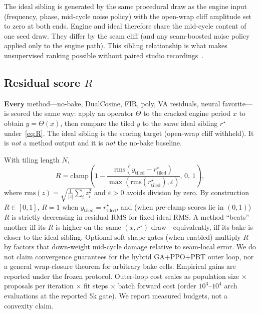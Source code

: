 The ideal sibling is generated by the same procedural draw as the engine input (frequency, phase, mid-cycle noise policy) with the open-wrap cliff amplitude set to zero at both ends.
Engine and ideal therefore share the mid-cycle content of one seed draw.
They differ by the seam cliff (and any seam-boosted noise policy applied only to the engine path).
This sibling relationship is what makes unsupervised ranking possible without paired studio recordings~\cite{lehtinen2018,kashyap2021n2n}.

\subsection{Residual score $R$}
\label{sec:residual-score}

\textbf{Every} method---no-bake, DualCosine, FIR, poly, VA residuals, neural favorite---is scored the same way:
apply an operator $\Theta$ to the cracked engine period $x$ to obtain $y=\Theta(x)$, then compare the tiled $y$ to the \emph{same} ideal sibling $r^{\star}$ under~\eqref{eq:R}.
The ideal sibling is the scoring target (open-wrap cliff withheld).
It is \emph{not} a method output and it is \emph{not} the no-bake baseline.

With tiling length $N$,
\begin{equation}
\label{eq:R}
R=\mathrm{clamp}\!\left(1-\frac{\mathrm{rms}(y_{\mathrm{tiled}}-r^{\star}_{\mathrm{tiled}})}{\max(\mathrm{rms}(r^{\star}_{\mathrm{tiled}}),\varepsilon)},\,0,\,1\right),
\end{equation}
where $\mathrm{rms}(z)=\sqrt{\frac{1}{|z|}\sum_i z_i^2}$ and $\varepsilon>0$ avoids division by zero.
By construction $R\in[0,1]$, $R{=}1$ when $y_{\mathrm{tiled}}=r^{\star}_{\mathrm{tiled}}$, and (when pre-clamp scores lie in $(0,1)$) $R$ is strictly decreasing in residual RMS for fixed ideal RMS.
A method ``beats'' another iff its $R$ is higher on the same $(x,r^{\star})$ draw---equivalently, iff its bake is closer to the ideal sibling.
Optional soft shape gates (when enabled) multiply $R$ by factors that down-weight mid-cycle damage relative to seam-local error.
We do not claim convergence guarantees for the hybrid GA{+}PPO{+}PBT outer loop, nor a general wrap-closure theorem for arbitrary bake cells.
Empirical gains are reported under the frozen protocol.
Outer-loop cost scales as population size $\times$ proposals per iteration $\times$ fit steps $\times$ batch forward cost (order $10^{3}$--$10^{4}$ arch evaluations at the reported $5$k gate). We report measured budgets, not a convexity claim.

